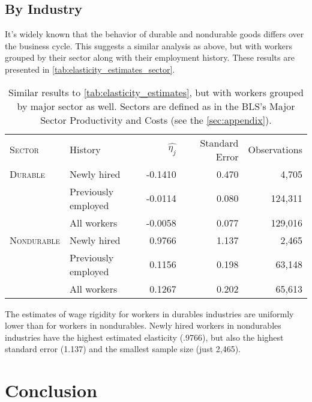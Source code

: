 \documentclass[11pt]{article}
\begin{document}
\subsection{By Industry}

It's widely known that the behavior of durable and nondurable goods differs over the business cycle.
This suggests a similar analysis as above, but with workers grouped by their sector along with their employment history.
These results are presented in \autoref{tab:elasticity_estimates_sector}.

\begin{table}
    \centering
    \begin{tabular}{llrrr} \toprule
       \textsc{Sector}     & History              & $\hat{\eta_j}$ & Standard Error   & Observations\\
       \textsc{Durable}    & Newly hired          & -0.1410         & 0.470            & 4,705       \\
                  & Previously employed  & -0.0114         & 0.080            & 124,311     \\
                  & All workers          & -0.0058         & 0.077            & 129,016     \\
       \textsc{Nondurable} & Newly hired          & 0.9766          & 1.137            & 2,465       \\
                  & Previously employed  & 0.1156          & 0.198            & 63,148      \\
                  & All workers          & 0.1267          & 0.202            & 65,613      \\ \bottomrule
    \end{tabular}
    \caption{
                Similar results to \autoref{tab:elasticity_estimates}, but with workers grouped by major sector as well. Sectors are defined as in the BLS's Major Sector Productivity and Costs (see the \autoref{sec:appendix}).
            }
    \label{tab:elasticity_estimates_sector}
\end{table}

The estimates of wage rigidity for workers in durables industries are uniformly lower than for workers in nondurables.
Newly hired workers in nondurables industries have the highest estimated elasticity (.9766), but also the highest standard error (1.137) and the smallest sample size (just 2,465).

\section{Conclusion}
\end{document}
